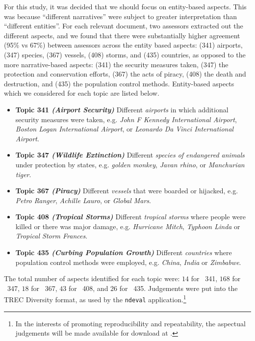 For this study, it was decided that we should focus on entity-based aspects. This was because ``different narratives'' were subject to greater interpretation than ``different entities''. For each relevant document, two assessors extracted out the different aspects, and we found that there were substantially higher agreement (95\% vs 67\%) between assessors across the entity based aspects: (341) airports, (347) species, (367) vessels, (408) storms, and  (435) countries, as opposed to the more narrative-based aspects: (341) the security measures taken, (347) the protection and conservation efforts, (367) the acts of piracy, (408) the death and destruction, and (435) the population control methods.  Entity-based aspects which we considered for each topic are listed below.

\begin{itemize}
    \item{\textbf{Topic 341 \emph{(Airport Security)}} Different \emph{airports} in which additional security measures were taken, e.g. \emph{John F Kennedy International Airport}, \emph{Boston Logan International Airport}, or \emph{Leonardo Da Vinci International Airport}.}
    \item{\textbf{Topic 347 \emph{(Wildlife Extinction)}} Different \emph{species of endangered animals} under protection by states, e.g. \emph{golden monkey}, \emph{Javan rhino}, or \emph{Manchurian tiger}.}
    \item{\textbf{Topic 367 \emph{(Piracy)}} Different \emph{vessels} that were boarded or hijacked, e.g. \emph{Petro Ranger}, \emph{Achille Lauro}, or \emph{Global Mars}.}
    \item{\textbf{Topic 408 \emph{(Tropical Storms)}} Different \emph{tropical storms} where people were killed or there was major damage, e.g. \emph{Hurricane Mitch}, \emph{Typhoon Linda} or \emph{Tropical Storm Frances}.}
    \item{\textbf{Topic 435 \emph{(Curbing Population Growth)}} Different \emph{countries} where population control methods were employed, e.g. \emph{China}, \emph{India} or \emph{Zimbabwe}.}
\end{itemize}

The total number of aspects identified for each topic were: $14$ for ~341, $168$ for ~347, $18$ for ~367, $43$ for ~408, and $26$ for ~435. Judgements were put into the TREC Diversity format, as used by the \texttt{ndeval} application.\footnote{In the interests of promoting reproducibility and repeatability, the aspectual judgements will be made available for download at .} %

